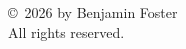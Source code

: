 \thispagestyle{empty}
\vspace*{3in}
\begin{center}
\copyright\ 2026 by Benjamin Foster\\
All rights reserved.
\end{center}
\clearpage
